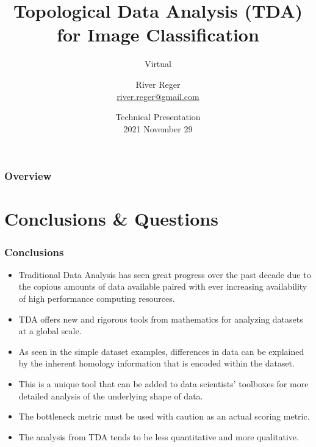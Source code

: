\documentclass[10pt]{beamer}
\title[TDA for Image Classification]{Topological Data Analysis (TDA) for Image Classification}
\subtitle{Virtual}
\author[River Reger]{River Reger \\ \href{mailto:river.reger@gmail.com}{river.reger@gmail.com}}
\date{\small Technical Presentation \\ 2021 November 29} %
\begin{document}
\begin{frame}
\titlepage %
\end{frame}

\begin{frame}
\frametitle{Overview}
\tableofcontents
\end{frame}






\section{Conclusions \& Questions}
	\begin{frame}
			\frametitle{Conclusions}
			\begin{itemize}
				\item Traditional Data Analysis has seen great progress over the past decade due to the copious amounts of data
				available paired with ever increasing availability of high performance computing resources.
				\item TDA offers new and rigorous tools from mathematics for analyzing datasets at a global scale.
				\item As seen in the simple dataset examples, differences in data can be explained by the inherent homology information that is encoded within the dataset.
				\item This is a unique tool that can be added to data scientists' toolboxes for more detailed analysis of the underlying shape of data.
				\item The bottleneck metric must be used with caution as an actual scoring metric.
				\item The analysis from TDA tends to be less quantitative and more qualitative.
			\end{itemize}
	\end{frame}
		
\end{document}
